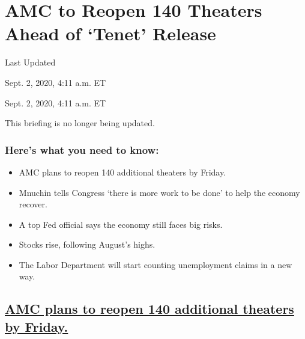 \hypertarget{amc-to-reopen-140-theaters-ahead-of-tenet-release}{%
\section{AMC to Reopen 140 Theaters Ahead of `Tenet'
Release}\label{amc-to-reopen-140-theaters-ahead-of-tenet-release}}

Last Updated

Sept. 2, 2020, 4:11 a.m. ET

Sept. 2, 2020, 4:11 a.m. ET

This briefing is no longer being updated.

\hypertarget{heres-what-you-need-to-know}{%
\subsubsection{Here's what you need to
know:}\label{heres-what-you-need-to-know}}

\begin{itemize}
\item
  \protect\hyperlink{amc-plans-to-reopen-140-additional-theaters-by-friday}{}

  AMC plans to reopen 140 additional theaters by Friday.
\item
  \protect\hyperlink{mnuchin-tells-congress-there-is-more-work-to-be-done-to-help-the-economy-recover}{}

  Mnuchin tells Congress `there is more work to be done' to help the
  economy recover.
\item
  \protect\hyperlink{a-top-fed-official-says-the-economy-still-faces-big-risks}{}

  A top Fed official says the economy still faces big risks.
\item
  \protect\hyperlink{stocks-rise-following-augusts-highs}{}

  Stocks rise, following August's highs.
\item
  \protect\hyperlink{the-labor-department-will-start-counting-unemployment-claims-in-a-new-way}{}

  The Labor Department will start counting unemployment claims in a new
  way.
\end{itemize}

\hypertarget{amc-plans-to-reopen-140-additional-theaters-by-friday}{%
\subsection{\texorpdfstring{\protect\hyperlink{amc-plans-to-reopen-140-additional-theaters-by-friday}{AMC
plans to reopen 140 additional theaters by
Friday.}}{AMC plans to reopen 140 additional theaters by Friday.}}\label{amc-plans-to-reopen-140-additional-theaters-by-friday}}

